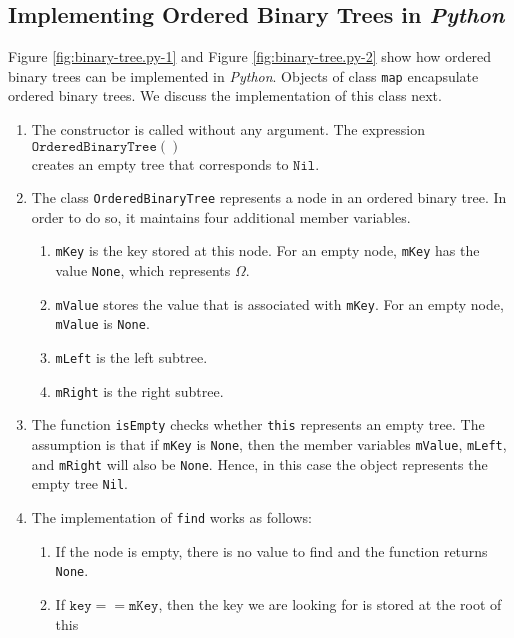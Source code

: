 \subsection{Implementing Ordered Binary Trees in \textsl{Python}}
Figure \ref{fig:binary-tree.py-1} and Figure \ref{fig:binary-tree.py-2} show how ordered binary
trees can be implemented in \textsl{Python}.  Objects of class \texttt{map} encapsulate ordered
binary trees.  We discuss the implementation of this class next.
\begin{enumerate}
\item The constructor is called without any argument.  The expression
      \\[0.2cm]
      \hspace*{1.3cm}
      $\texttt{OrderedBinaryTree}()$
      \\[0.2cm]
      creates an empty tree that corresponds to $\texttt{Nil}$.
\item The class \texttt{OrderedBinaryTree} represents a node in an ordered binary tree.  In order to do so, it
      maintains four additional member variables.
      \begin{enumerate}
      \item \texttt{mKey} is the key stored at this node.  For an empty node, \texttt{mKey}
            has the value \texttt{None}, which represents $\Omega$.
      \item \texttt{mValue} stores the value that is associated with \texttt{mKey}.  For an empty node,
            \texttt{mValue} is \texttt{None}.
      \item \texttt{mLeft} is the left subtree.  
      \item \texttt{mRight} is the right subtree.  
      \end{enumerate}
\item The function \texttt{isEmpty} checks whether \texttt{this} represents an empty tree.
      The assumption is that if \texttt{mKey} is \texttt{None}, then the member variables
      \texttt{mValue}, \texttt{mLeft}, and \texttt{mRight} will also be \texttt{None}.
      Hence, in this case the object represents the empty tree \texttt{Nil}.
\item The implementation of \texttt{find} works as follows:
      \begin{enumerate}
      \item If the node is empty, there is no value to find and the function returns \texttt{None}.
      \item If $\texttt{key} == \texttt{mKey}$, then the key we are looking for is stored at the root of this

\end{enumerate}
\end{enumerate}
